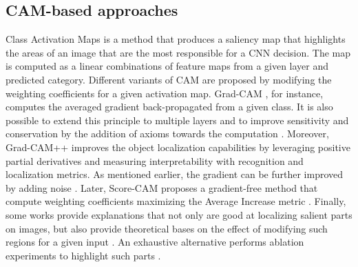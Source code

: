 \subsection{CAM-based approaches} Class Activation Maps \cite{cam} is a method that produces a saliency map that highlights the areas of an image that are the most responsible for a CNN decision. 
The map is computed as a linear combinations of feature maps from a given layer and predicted category.
Different variants of CAM are proposed by modifying the weighting coefficients for a given activation map. Grad-CAM \cite{gradcam}, for instance, computes the averaged gradient back-propagated from a given class. 
It is also possible to extend this principle to multiple layers \cite{layercam} and 
to improve sensitivity \cite{sundararajan2017axiomatic} and conservation \cite{montavon2018methods} by the addition of axioms towards the computation \cite{axiombased}. Moreover, Grad-CAM++ \cite{gradcampp}  improves the object localization capabilities by leveraging positive partial derivatives and measuring interpretability with recognition and localization metrics. 
As mentioned earlier, the gradient can be further improved by adding noise \cite{smoothgrad}. %
Later, Score-CAM \cite{scorecam} proposes a gradient-free method that compute weighting coefficients maximizing the Average Increase metric \cite{gradcampp}. 
Finally, some works provide explanations that not only are good at localizing salient parts on images, but also provide theoretical bases on the effect of modifying such regions for a given input \cite{axiombased}.
An exhaustive alternative  performs ablation experiments to highlight such parts \cite{ramaswamy2020ablation}.










